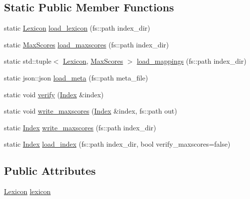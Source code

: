 \subsection*{Static Public Member Functions}
\begin{DoxyCompactItemize}
\item 
static \hyperlink{namespacebloodhound_a94032a3533df0a1b6d3435bad57e6499}{Lexicon} \hyperlink{classbloodhound_1_1index_1_1Index_a80968041cad02a4006fd4b633c279030}{load\+\_\+lexicon} (fs\+::path index\+\_\+dir)
\item 
static \hyperlink{namespacebloodhound_a687d80c6f992eba8b820bf30a482f4b4}{Max\+Scores} \hyperlink{classbloodhound_1_1index_1_1Index_a6333778f622dbf964ba6aea29a56dca0}{load\+\_\+maxscores} (fs\+::path index\+\_\+dir)
\item 
static std\+::tuple$<$ \hyperlink{namespacebloodhound_a94032a3533df0a1b6d3435bad57e6499}{Lexicon}, \hyperlink{namespacebloodhound_a687d80c6f992eba8b820bf30a482f4b4}{Max\+Scores} $>$ \hyperlink{classbloodhound_1_1index_1_1Index_a779359e7ce40294dd3d3666c00762700}{load\+\_\+mappings} (fs\+::path index\+\_\+dir)
\item 
static json\+::json \hyperlink{classbloodhound_1_1index_1_1Index_af0d9b72f7cf6b54d7bddbccd3c1898ce}{load\+\_\+meta} (fs\+::path meta\+\_\+file)
\item 
static void \hyperlink{classbloodhound_1_1index_1_1Index_a6f1e18905c2b5babd30f33467c79018a}{verify} (\hyperlink{classbloodhound_1_1index_1_1Index}{Index} \&index)
\item 
static void \hyperlink{classbloodhound_1_1index_1_1Index_a02e947bdd77e51dcb09db5b7f03f14c7}{write\+\_\+maxscores} (\hyperlink{classbloodhound_1_1index_1_1Index}{Index} \&index, fs\+::path out)
\item 
static \hyperlink{classbloodhound_1_1index_1_1Index}{Index} \hyperlink{classbloodhound_1_1index_1_1Index_a46fcfc3c54ecf18d4ff58a240557b567}{write\+\_\+maxscores} (fs\+::path index\+\_\+dir)
\item 
static \hyperlink{classbloodhound_1_1index_1_1Index}{Index} \hyperlink{classbloodhound_1_1index_1_1Index_ad4cd13bef623fc6b786f8003c8826b9c}{load\+\_\+index} (fs\+::path index\+\_\+dir, bool verify\+\_\+maxscores=false)
\end{DoxyCompactItemize}
\subsection*{Public Attributes}
\begin{DoxyCompactItemize}
\item 
\hyperlink{namespacebloodhound_a94032a3533df0a1b6d3435bad57e6499}{Lexicon} \hyperlink{classbloodhound_1_1index_1_1Index_a746d80c2fb411f512726c8d37cad78fc}{lexicon}
\end{DoxyCompactItemize}
